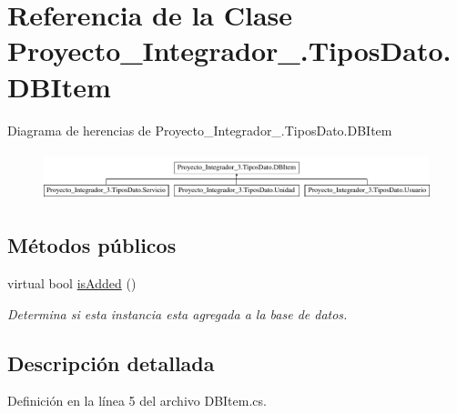 \hypertarget{class_proyecto___integrador__3_1_1_tipos_dato_1_1_d_b_item}{\section{Referencia de la Clase Proyecto\-\_\-\-Integrador\-\_.\-Tipos\-Dato.\-D\-B\-Item}
\label{class_proyecto___integrador__3_1_1_tipos_dato_1_1_d_b_item}
}
Diagrama de herencias de Proyecto\-\_\-\-Integrador\-\_.\-Tipos\-Dato.\-D\-B\-Item\begin{figure}[H]
\begin{center}
\leavevmode
\includegraphics[height=1.430396cm]{class_proyecto___integrador__3_1_1_tipos_dato_1_1_d_b_item}
\end{center}
\end{figure}
\subsection*{Métodos públicos}
\begin{DoxyCompactItemize}
\item 
virtual bool \hyperlink{class_proyecto___integrador__3_1_1_tipos_dato_1_1_d_b_item_ab88d7eef0fa58d7d5fdf40039867dd6e}{is\-Added} ()
\begin{DoxyCompactList}\small\item\em Determina si esta instancia esta agregada a la base de datos. \end{DoxyCompactList}\end{DoxyCompactItemize}


\subsection{Descripción detallada}


Definición en la línea 5 del archivo D\-B\-Item.\-cs.




